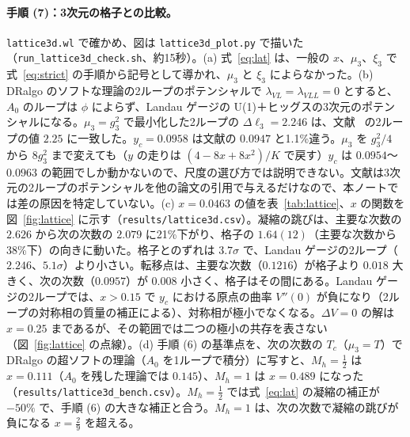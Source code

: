 \documentclass[a4paper,10pt]{ltjsarticle}
\begin{document}
\paragraph{手順 (7)：3次元の格子との比較。}\texttt{lattice3d.wl} で確かめ、図は \texttt{lattice3d\_plot.py} で描いた（\texttt{run\_lattice3d\_check.sh}、約15秒）。(a) 式~\eqref{eq:lat} は、一般の $x$、$\mu_3$、$\xi_3$ で式~\eqref{eq:strict} の手順から記号として導かれ、$\mu_3$ と $\xi_3$ によらなかった。(b) DRalgo のソフトな理論の2ループのポテンシャルで $\lambda_{VL}=\lambda_{VLL}=0$ とすると、$A_0$ のループは $\phi$ によらず、Landau ゲージの U(1)＋ヒッグスの3次元のポテンシャルになる。$\mu_3=g_3^2$ で最小化した2ループの $\Delta\ell_3=2.246$ は、文献~\cite{kklp98} の2ループの値 $2.25$ に一致した。$y_c=0.0958$ は文献の $0.0947$ と1.1\%違う。$\mu_3$ を $g_3^2/4$ から $8g_3^2$ まで変えても（$y$ の走りは $(4-8x+8x^2)/K$ で戻す）$y_c$ は $0.0954$〜$0.0963$ の範囲でしか動かないので、尺度の選び方では説明できない。文献は3次元の2ループのポテンシャルを他の論文の引用で与えるだけなので、本ノートでは差の原因を特定していない。(c) $x=0.0463$ の値を表~\ref{tab:lattice}、$x$ の関数を図~\ref{fig:lattice} に示す（\texttt{results/lattice3d.csv}）。凝縮の跳びは、主要な次数の $2.626$ から次の次数の $2.079$ に21\%下がり、格子の $1.64(12)$（主要な次数から38\%下）の向きに動いた。格子とのずれは $3.7\sigma$ で、Landau ゲージの2ループ（$2.246$、$5.1\sigma$）より小さい。転移点は、主要な次数（$0.1216$）が格子より $0.018$ 大きく、次の次数（$0.0957$）が $0.008$ 小さく、格子はその間にある。Landau ゲージの2ループでは、$x>0.15$ で $y_c$ における原点の曲率 $V''(0)$ が負になり（2ループの対称相の質量の補正による）、対称相が極小でなくなる。$\Delta V=0$ の解は $x=0.25$ まであるが、その範囲では二つの極小の共存を表さない（図~\ref{fig:lattice} の点線）。(d) 手順 (6) の基準点を、次の次数の $T_c$（$\mu_3=T$）で DRalgo の超ソフトの理論（$A_0$ を1ループで積分）に写すと、$M_h=\frac12$ は $x=0.111$（$A_0$ を残した理論では $0.145$）、$M_h=1$ は $x=0.489$ になった（\texttt{results/lattice3d\_bench.csv}）。$M_h=\frac12$ では式~\eqref{eq:lat} の凝縮の補正が $-50\%$ で、手順 (6) の大きな補正と合う。$M_h=1$ は、次の次数で凝縮の跳びが負になる $x=\frac29$ を超える。
\end{document}
